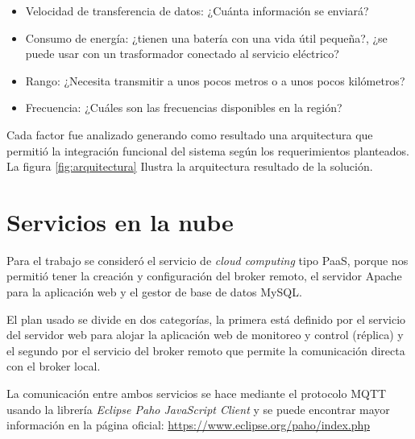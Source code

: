 \begin{itemize}
\item Velocidad de transferencia de datos: ¿Cuánta información se enviará?
\item Consumo de energía: ¿tienen una batería con una vida útil pequeña?, ¿se puede usar con un trasformador conectado al servicio eléctrico?
\item Rango: ¿Necesita transmitir a unos pocos metros o a unos pocos kilómetros?
\item Frecuencia: ¿Cuáles son las frecuencias disponibles en la región?
\end{itemize}

\vspace{0.5cm}
Cada factor fue analizado generando como resultado una arquitectura que permitió la integración funcional del sistema según los requerimientos planteados. La figura \ref{fig:arquitectura} Ilustra la arquitectura resultado de la solución.

\section{Servicios en la nube}

Para el trabajo se consideró el servicio de \emph{cloud computing} tipo PaaS, porque nos permitió tener la creación y configuración del broker remoto, el servidor Apache para la aplicación web y el gestor de base de datos MySQL.

El plan usado se divide en dos categorías, la primera está definido por el servicio del servidor web para alojar la aplicación web de monitoreo y control (réplica) y el segundo por el servicio del broker remoto que permite la comunicación directa con el broker local. 

La comunicación entre ambos servicios se hace mediante el protocolo MQTT usando la librería  \emph{Eclipse Paho JavaScript Client} y se puede encontrar mayor información en la página oficial: \url{https://www.eclipse.org/paho/index.php} 


